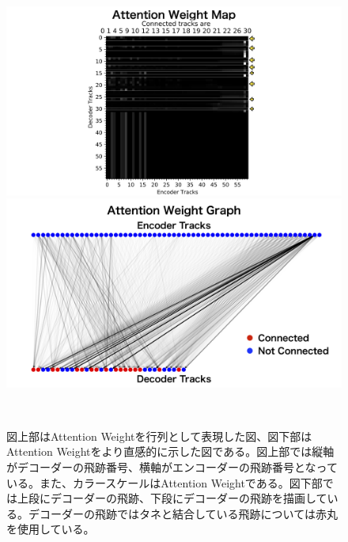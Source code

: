 \begin{figure}[htbp]
 \centering
   \begin{minipage}{1.0\textwidth}
    \centering
    \includegraphics[trim = 200 0 200 0, width=1.0\textwidth, clip]{Figure/3Networks/3-4-3-3AttentionWeightMap.png}
   \end{minipage}
   
   \begin{minipage}{1.0\textwidth}
   \centering
    \includegraphics[trim = 100 0 100 0, width=1.0\textwidth, clip]{Figure/3Networks/3-4-3-3AttentionWeightGraph.png}
   \end{minipage}
  \caption[Attention Weight]{図上部はAttention Weightを行列として表現した図、図下部はAttention Weightをより直感的に示した図である。図上部では縦軸がデコーダーの飛跡番号、横軸がエンコーダーの飛跡番号となっている。また、カラースケールはAttention Weightである。図下部では上段にデコーダーの飛跡、下段にデコーダーの飛跡を描画している。デコーダーの飛跡ではタネと結合している飛跡については赤丸を使用している。}
  \label{3-4-3-3AttentionWeight}
\end{figure}



























